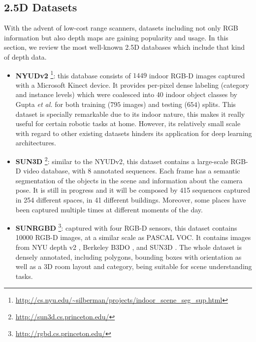 \subsection{\acs{2.5D} Datasets}

With the advent of low-cost range scanners, datasets including not only \acs{RGB} information but also depth maps are gaining popularity and usage. In this section, we review the most well-known \acs{2.5D} databases which include that kind of depth data.

\begin{itemize}
	\item \textbf{NYUDv2} \cite{Silberman2012}\footnote{\url{http://cs.nyu.edu/~silberman/projects/indoor_scene_seg_sup.html}}: this database consists of $1449$ indoor RGB-D images captured with a Microsoft Kinect device. It provides per-pixel dense labeling (category and instance levels) which were coalesced into 40 indoor object classes by Gupta \emph{et al.}\cite{Gupta2013} for both training ($795$ images) and testing ($654$) splits. This dataset is specially remarkable due to its indoor nature, this makes it really useful for certain robotic tasks at home. However, its relatively small scale with regard to other existing datasets hinders its application for deep learning architectures.	
	\item \textbf{SUN3D} 
	\cite{Xiao2013}\footnote{\url{http://sun3d.cs.princeton.edu/}}:
	similar to the NYUDv2, this dataset contains a large-scale \ac{RGB-D} video database, with 8 annotated sequences. Each frame has a semantic segmentation of the objects in the scene and information about the camera pose. It is still in progress and it will be composed by 415 sequences captured in 254 different spaces, in 41 different buildings. Moreover, some places have been captured multiple times at different moments of the day.
	\item \textbf{SUNRGBD}
	\cite{Song2015b}\footnote{\url{http://rgbd.cs.princeton.edu/}}:
	captured with four \ac{RGB-D} sensors, this dataset contains 10000 RGB-D images, at a similar scale as PASCAL VOC. It contains images from NYU depth v2 \cite{Silberman2012}, Berkeley B3DO \cite{Janoch2013}, and SUN3D \cite{Xiao2013}. The whole dataset is densely annotated, including polygons, bounding boxes with orientation as well as a 3D room layout and category, being suitable for scene understanding tasks.

\end{itemize}
